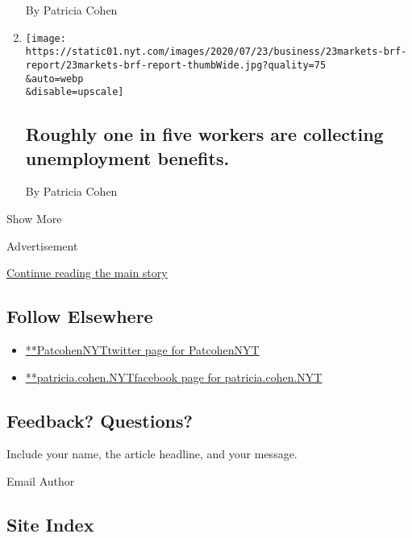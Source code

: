 \begin{enumerate}
  By Patricia Cohen
\item
  \href{/live/2020/07/23/business/stock-market-today-coronavirus/roughly-one-in-five-workers-are-collecting-unemployment-benefits}{}

  \texttt{[image: https://static01.nyt.com/images/2020/07/23/business/23markets-brf-report/23markets-brf-report-thumbWide.jpg?quality=75\\\&auto=webp\\\&disable=upscale]}

  \hypertarget{roughly-one-in-five-workers-are-collecting-unemployment-benefits}{%
  \subsection{Roughly one in five workers are collecting unemployment
  benefits.}\label{roughly-one-in-five-workers-are-collecting-unemployment-benefits}}

  By Patricia Cohen
\end{enumerate}

Show More

Advertisement

\protect\hyperlink{after-mid2}{Continue reading the main story}

\hypertarget{follow-elsewhere}{%
\subsection{Follow Elsewhere}\label{follow-elsewhere}}

\begin{itemize}
\tightlist
\item
  \href{https://twitter.com/PatcohenNYT}{**PatcohenNYTtwitter page for
  PatcohenNYT}
\item
  \href{https://www.facebook.com/patricia.cohen.NYT}{**patricia.cohen.NYTfacebook
  page for patricia.cohen.NYT}
\end{itemize}

\hypertarget{feedback-questions}{%
\subsection{Feedback? Questions?}\label{feedback-questions}}

Include your name, the article headline, and your message.

Email Author

\hypertarget{site-index}{%
\subsection{Site Index}\label{site-index}}

